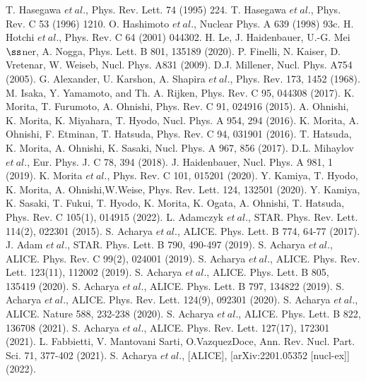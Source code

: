 \begin{thebibliography}{99}
T. Hasegawa $et\ al.$, Phys. Rev. Lett. 74 (1995) 224.
T. Hasegawa $et\ al.$, Phys. Rev. C 53 (1996) 1210.
O. Hashimoto $et\ al.$, Nuclear Phys. A 639 (1998) 93c.
H. Hotchi $et\ al.$, Phys. Rev. C 64 (2001) 044302.
H. Le, J. Haidenbauer, U.-G. Mei$\ss$ner, A. Nogga, Phys. Lett. B 801, 135189 (2020).
P. Finelli, N. Kaiser, D. Vretenar, W. Weiseb, Nucl. Phys. A831 (2009).
D.J. Millener, Nucl. Phys. A754 (2005).
G. Alexander, U. Karshon, A. Shapira $et\ al.$, Phys. Rev. 173, 1452 (1968).
M. Isaka, Y. Yamamoto, and Th. A. Rijken, Phys. Rev. C 95, 044308 (2017).
K. Morita, T. Furumoto, A. Ohnishi, Phys. Rev. C 91, 024916 (2015).
A. Ohnishi, K. Morita, K. Miyahara, T. Hyodo, Nucl. Phys. A 954, 294 (2016).
K. Morita, A. Ohnishi, F. Etminan, T. Hatsuda, Phys. Rev. C 94, 031901 (2016).
T. Hatsuda, K. Morita, A. Ohnishi, K. Sasaki, Nucl. Phys. A 967, 856 (2017).
D.L. Mihaylov $et\ al.$, Eur. Phys. J. C 78, 394 (2018).
J. Haidenbauer, Nucl. Phys. A 981, 1 (2019).
K. Morita $et\ al.$, Phys. Rev. C 101, 015201 (2020).
Y. Kamiya, T. Hyodo, K. Morita, A. Ohnishi,W.Weise, Phys. Rev. Lett. 124, 132501 (2020).
Y. Kamiya, K. Sasaki, T. Fukui, T. Hyodo, K. Morita, K. Ogata, A. Ohnishi, T. Hatsuda, Phys. Rev. C 105(1), 014915 (2022).
L. Adamczyk $et\ al.$, STAR. Phys. Rev. Lett. 114(2), 022301 (2015).
S. Acharya $et\ al.$, ALICE. Phys. Lett. B 774, 64-77 (2017).
J. Adam $et\ al.$, STAR. Phys. Lett. B 790, 490-497 (2019).
S. Acharya $et\ al.$, ALICE. Phys. Rev. C 99(2), 024001 (2019).
S. Acharya $et\ al.$, ALICE. Phys. Rev. Lett. 123(11), 112002 (2019).
S. Acharya $et\ al.$, ALICE. Phys. Lett. B 805, 135419 (2020).
S. Acharya $et\ al.$, ALICE. Phys. Lett. B 797, 134822 (2019).
S. Acharya $et\ al.$, ALICE. Phys. Rev. Lett. 124(9), 092301 (2020).
S. Acharya $et\ al.$, ALICE. Nature 588, 232-238 (2020).
S. Acharya $et\ al.$, ALICE. Phys. Lett. B 822, 136708 (2021).
S. Acharya $et\ al.$, ALICE. Phys. Rev. Lett. 127(17), 172301 (2021).
L. Fabbietti, V. Mantovani Sarti, O.VazquezDoce, Ann. Rev. Nucl. Part. Sci. 71, 377-402 (2021).
S. Acharya $et\ al.$, [ALICE], [arXiv:2201.05352 [nucl-ex]] (2022).


\end{thebibliography}
